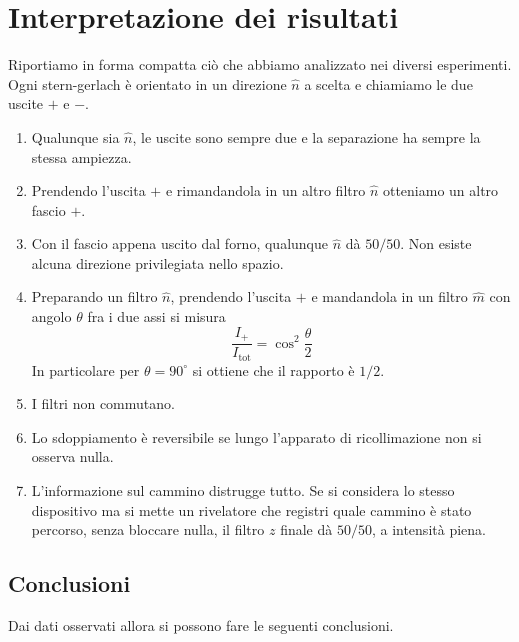 \section{Interpretazione dei risultati}

Riportiamo in forma compatta ciò che abbiamo analizzato nei diversi esperimenti. Ogni stern-gerlach è orientato in un direzione $\hat{n}$ a scelta e chiamiamo le due uscite $+$ e $-$. 

\begin{enumerate}
    \item Qualunque sia $\hat{n}$, le uscite sono sempre due e la separazione ha sempre la stessa ampiezza. 
    \item Prendendo l'uscita $+$ e rimandandola in un altro filtro $\hat{n}$ otteniamo un altro fascio $+$. 
    \item Con il fascio appena uscito dal forno, qualunque $\hat n$ dà $50/50$. Non esiste alcuna direzione privilegiata nello spazio.
    \item Preparando un filtro $\hat{n}$, prendendo l'uscita $+$ e mandandola in un filtro $\hat{m}$ con angolo $\theta$ fra i due assi si misura 
    \begin{equation}
      \frac{I_+}{I_{\text{tot}}} = \cos^2 \frac{\theta}{2}
    \end{equation}
    In particolare per $\theta = 90^{\circ}$ si ottiene che il rapporto è $1/2$.
    \item I filtri non commutano.
    \item Lo sdoppiamento è reversibile se lungo l'apparato di ricollimazione non si osserva nulla. 
    \item L’informazione sul cammino distrugge tutto. Se si considera lo stesso dispositivo ma si mette un rivelatore che registri quale cammino è stato percorso, senza bloccare nulla, il filtro $z$ finale dà $50/50$, a intensità piena.
\end{enumerate}

\subsection{Conclusioni} 

Dai dati osservati allora si possono fare le seguenti conclusioni. 

